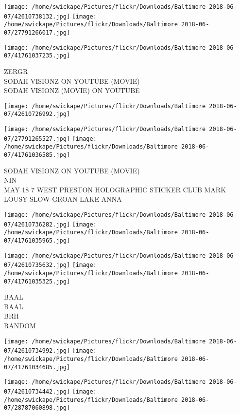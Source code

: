 \documentclass[10pt,letterpaper]{article}
\begin{document}
\texttt{[image: /home/swickape/Pictures/flickr/Downloads/Baltimore 2018-06-07/42610738132.jpg]}
\texttt{[image: /home/swickape/Pictures/flickr/Downloads/Baltimore 2018-06-07/27791266017.jpg]}

\texttt{[image: /home/swickape/Pictures/flickr/Downloads/Baltimore 2018-06-07/41761037235.jpg]}

ZERGR\\
SODAH VISIONZ ON YOUTUBE (MOVIE)\\
SODAH VISIONZ (MOVIE) ON YOUTUBE
\pagebreak

\texttt{[image: /home/swickape/Pictures/flickr/Downloads/Baltimore 2018-06-07/42610726992.jpg]}

\vspace{0.25in}
\texttt{[image: /home/swickape/Pictures/flickr/Downloads/Baltimore 2018-06-07/27791265527.jpg]}
\texttt{[image: /home/swickape/Pictures/flickr/Downloads/Baltimore 2018-06-07/41761036585.jpg]}

SODAH VISIONZ ON YOUTUBE (MOVIE)\\
NIN\\
MAY 18 7 WEST PRESTON HOLOGRAPHIC STICKER CLUB MARK LOUSY SLOW GROAN LAKE ANNA
\pagebreak

\texttt{[image: /home/swickape/Pictures/flickr/Downloads/Baltimore 2018-06-07/42610736282.jpg]}
\texttt{[image: /home/swickape/Pictures/flickr/Downloads/Baltimore 2018-06-07/41761035965.jpg]}

\texttt{[image: /home/swickape/Pictures/flickr/Downloads/Baltimore 2018-06-07/42610735632.jpg]}
\texttt{[image: /home/swickape/Pictures/flickr/Downloads/Baltimore 2018-06-07/41761035325.jpg]}

BAAL\\
BAAL\\
BRH\\
RANDOM
\pagebreak

\texttt{[image: /home/swickape/Pictures/flickr/Downloads/Baltimore 2018-06-07/42610734992.jpg]}
\texttt{[image: /home/swickape/Pictures/flickr/Downloads/Baltimore 2018-06-07/41761034685.jpg]}

\texttt{[image: /home/swickape/Pictures/flickr/Downloads/Baltimore 2018-06-07/42610734442.jpg]}
\texttt{[image: /home/swickape/Pictures/flickr/Downloads/Baltimore 2018-06-07/28787060898.jpg]}
\end{document}
